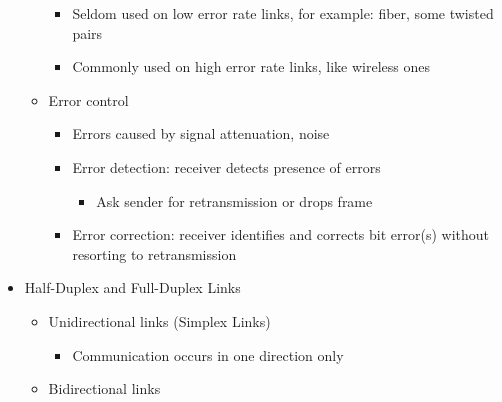 \begin{itemize}
\begin{itemize}
\begin{itemize}
          \item Seldom used on low error rate links, for example: fiber, some twisted pairs

          \item Commonly used on high error rate links, like wireless ones

        \end{itemize}

      \item Error control

        \begin{itemize}

          \item Errors caused by signal attenuation, noise

          \item Error detection: receiver detects presence of errors

            \begin{itemize}

              \item Ask sender for retransmission or drops frame

            \end{itemize}

          \item Error correction: receiver identifies and corrects bit error(s) without resorting to retransmission

        \end{itemize}

    \end{itemize}

  \item Half-Duplex and Full-Duplex Links

    \begin{itemize}

      \item Unidirectional links (Simplex Links)

        \begin{itemize}

          \item Communication occurs in one direction only

        \end{itemize}

      \item Bidirectional links 

        \begin{itemize}


\end{itemize}
\end{itemize}
\end{itemize}
